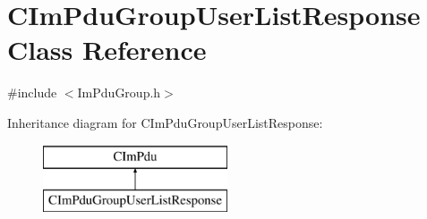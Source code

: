 \hypertarget{class_c_im_pdu_group_user_list_response}{}\section{C\+Im\+Pdu\+Group\+User\+List\+Response Class Reference}
\label{class_c_im_pdu_group_user_list_response}


{\ttfamily \#include $<$Im\+Pdu\+Group.\+h$>$}

Inheritance diagram for C\+Im\+Pdu\+Group\+User\+List\+Response\+:\begin{figure}[H]
\begin{center}
\leavevmode
\includegraphics[height=2.000000cm]{class_c_im_pdu_group_user_list_response}
\end{center}
\end{figure}

